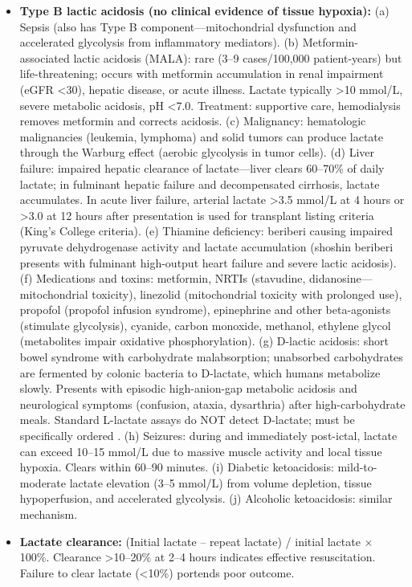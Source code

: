 \begin{itemize}
  \item \textbf{Type B lactic acidosis (no clinical evidence of tissue hypoxia):} (a) Sepsis (also has Type B component---mitochondrial dysfunction and accelerated glycolysis from inflammatory mediators). (b) Metformin-associated lactic acidosis (MALA): rare (3--9 cases/100,000 patient-years) but life-threatening; occurs with metformin accumulation in renal impairment (eGFR <30), hepatic disease, or acute illness. Lactate typically >10 mmol/L, severe metabolic acidosis, pH <7.0. Treatment: supportive care, hemodialysis removes metformin and corrects acidosis. (c) Malignancy: hematologic malignancies (leukemia, lymphoma) and solid tumors can produce lactate through the Warburg effect (aerobic glycolysis in tumor cells). (d) Liver failure: impaired hepatic clearance of lactate---liver clears 60--70\% of daily lactate; in fulminant hepatic failure and decompensated cirrhosis, lactate accumulates. In acute liver failure, arterial lactate >3.5 mmol/L at 4 hours or >3.0 at 12 hours after presentation is used for transplant listing criteria (King's College criteria). (e) Thiamine deficiency: beriberi causing impaired pyruvate dehydrogenase activity and lactate accumulation (shoshin beriberi presents with fulminant high-output heart failure and severe lactic acidosis). (f) Medications and toxins: metformin, NRTIs (stavudine, didanosine---mitochondrial toxicity), linezolid (mitochondrial toxicity with prolonged use), propofol (propofol infusion syndrome), epinephrine and other beta-agonists (stimulate glycolysis), cyanide, carbon monoxide, methanol, ethylene glycol (metabolites impair oxidative phosphorylation). (g) D-lactic acidosis: short bowel syndrome with carbohydrate malabsorption; unabsorbed carbohydrates are fermented by colonic bacteria to D-lactate, which humans metabolize slowly. Presents with episodic high-anion-gap metabolic acidosis and neurological symptoms (confusion, ataxia, dysarthria) after high-carbohydrate meals. Standard L-lactate assays do NOT detect D-lactate; must be specifically ordered \cite{uribarri1998dlactic}. (h) Seizures: during and immediately post-ictal, lactate can exceed 10--15 mmol/L due to massive muscle activity and local tissue hypoxia. Clears within 60--90 minutes. (i) Diabetic ketoacidosis: mild-to-moderate lactate elevation (3--5 mmol/L) from volume depletion, tissue hypoperfusion, and accelerated glycolysis. (j) Alcoholic ketoacidosis: similar mechanism.
  \item \textbf{Lactate clearance:} (Initial lactate -- repeat lactate) / initial lactate $\times$ 100\%. Clearance >10--20\% at 2--4 hours indicates effective resuscitation. Failure to clear lactate (<10\%) portends poor outcome.
\end{itemize}

